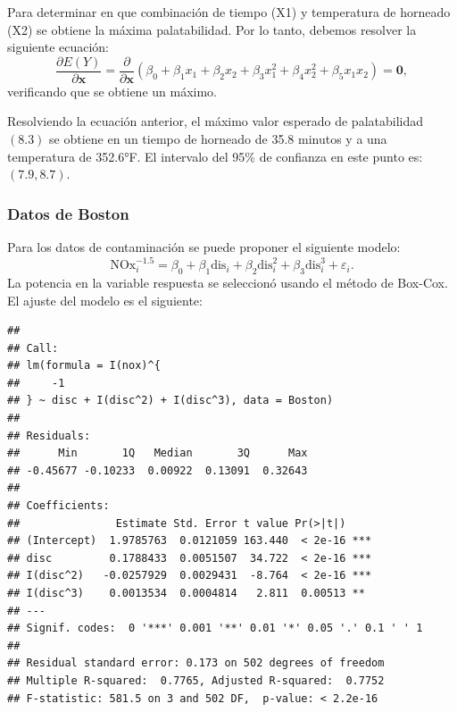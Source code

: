 \documentclass[
]{article}
\newenvironment{Shaded}{\begin{snugshade}}{\end{snugshade}}
\newcommand{\AttributeTok}[1]{\textcolor[rgb]{0.77,0.63,0.00}{#1}}
\newcommand{\DecValTok}[1]{\textcolor[rgb]{0.00,0.00,0.81}{#1}}
\newcommand{\FunctionTok}[1]{\textcolor[rgb]{0.00,0.00,0.00}{#1}}
\newcommand{\NormalTok}[1]{#1}
\newcommand{\OtherTok}[1]{\textcolor[rgb]{0.56,0.35,0.01}{#1}}
\newcommand{\SpecialCharTok}[1]{\textcolor[rgb]{0.00,0.00,0.00}{#1}}
\begin{document}
Para determinar en que combinación de tiempo (X1) y temperatura de horneado (X2) se obtiene la máxima palatabilidad. Por lo tanto, debemos resolver la siguiente ecuación:
\[
\frac{\partial E(Y)}{\partial \boldsymbol x}  = \frac{\partial}{\partial \boldsymbol x} \left( \beta_{0} + \beta_{1}x_{1} + \beta_{2}x_{2} + \beta_{3}x_{1}^2 + \beta_{4}x_{2}^{2} + \beta_{5}x_{1}x_{2} \right) = \boldsymbol 0,
\]
verificando que se obtiene un máximo.

Resolviendo la ecuación anterior, el máximo valor esperado de palatabilidad \((8.3)\) se obtiene en un tiempo de horneado de 35.8 minutos y a una temperatura de \ang{352.6}F. El intervalo del 95\% de confianza en este punto es: \((7.9, 8.7)\).

\hypertarget{datos-de-boston-1}{%
\subsubsection{Datos de Boston}\label{datos-de-boston-1}}

Para los datos de contaminación se puede proponer el siguiente modelo:
\[
\mbox{NOx}_{i}^{-1.5} = \beta_{0} + \beta_{1}\mbox{dis}_{i} + \beta_{2}\mbox{dis}_{i}^{2} + \beta_{3}\mbox{dis}_{i}^{3} + \varepsilon_{i}.
\]
La potencia en la variable respuesta se seleccionó usando el método de Box-Cox. El ajuste del modelo es el siguiente:

\begin{Shaded}
\end{Shaded}

\begin{verbatim}
## 
## Call:
## lm(formula = I(nox)^{
##     -1
## } ~ disc + I(disc^2) + I(disc^3), data = Boston)
## 
## Residuals:
##      Min       1Q   Median       3Q      Max 
## -0.45677 -0.10233  0.00922  0.13091  0.32643 
## 
## Coefficients:
##               Estimate Std. Error t value Pr(>|t|)    
## (Intercept)  1.9785763  0.0121059 163.440  < 2e-16 ***
## disc         0.1788433  0.0051507  34.722  < 2e-16 ***
## I(disc^2)   -0.0257929  0.0029431  -8.764  < 2e-16 ***
## I(disc^3)    0.0013534  0.0004814   2.811  0.00513 ** 
## ---
## Signif. codes:  0 '***' 0.001 '**' 0.01 '*' 0.05 '.' 0.1 ' ' 1
## 
## Residual standard error: 0.173 on 502 degrees of freedom
## Multiple R-squared:  0.7765, Adjusted R-squared:  0.7752 
## F-statistic: 581.5 on 3 and 502 DF,  p-value: < 2.2e-16
\end{verbatim}
\end{document}
